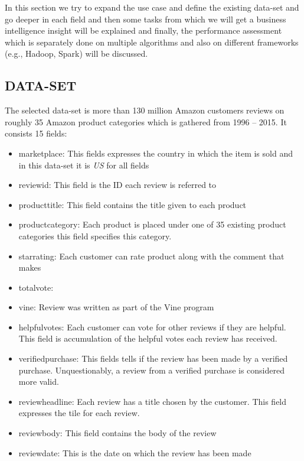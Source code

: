 In this section we try to expand the use case and define the existing data-set and go deeper in each field and then some tasks from which we will get a business intelligence insight will be explained and finally, the performance assessment which is separately done on multiple algorithms and also on different frameworks (e.g., Hadoop, Spark) will be discussed. 

\subsection{DATA-SET}
The selected data-set is more than 130 million Amazon customers reviews on roughly 35 Amazon product categories which is gathered from 1996 – 2015. It consists 15 fields:
\begin{itemize}
    \item marketplace: This fields expresses the country in which the item is sold and in this data-set it is \emph{US} for all fields
    \item review\textunderscore id: This field is the ID each review is referred to 
    \item product\textunderscore title: This field contains the title given to each product
    \item product\textunderscore category: Each product is placed under one of 35 existing product categories this field specifies this category.
    \item star\textunderscore rating: Each customer can rate product along with the comment that makes
    \item total\textunderscore vote: 
    \item vine: Review was written as part of the Vine program
    \item helpful\textunderscore votes: Each customer can vote for other reviews if they are helpful. This field is accumulation of the helpful votes each review has received.
    \item verified\textunderscore purchase: This fields tells if the review has been made by a verified purchase. Unquestionably, a review from a verified purchase is considered more valid. 
    \item review\textunderscore headline: Each review has a title chosen by the customer. This field expresses the tile for each review.
    \item review\textunderscore body: This field contains the body of the review
    \item review\textunderscore date: This is the date on which the review has been made
\end{itemize}

